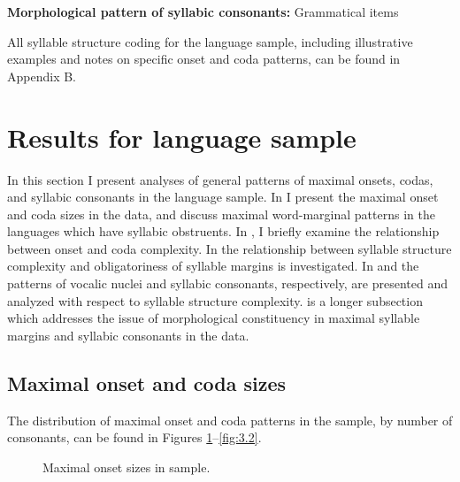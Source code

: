\textbf{Morphological pattern of syllabic consonants:} Grammatical items
\z

  All syllable structure coding for the language sample, including illustrative examples and notes on specific onset and coda patterns, can be found in Appendix B.

\section{Results for language sample}\label{sec:3.3}

  In this section I present analyses of general patterns of maximal onsets, codas, and syllabic consonants in the language sample. In  I present the maximal onset and coda sizes in the data, and discuss maximal word-marginal patterns in the languages which have syllabic obstruents. In , I briefly examine the relationship between onset and coda complexity. In  the relationship between syllable structure complexity and obligatoriness of syllable margins is investigated. In  and  the patterns of vocalic nuclei and syllabic consonants, respectively, are presented and analyzed with respect to syllable structure complexity.  is a longer subsection which addresses the issue of morphological constituency in maximal syllable margins and syllabic consonants in the data.

\subsection{Maximal onset and coda sizes}\label{sec:3.3.1}

  The distribution of maximal onset and coda patterns in the sample, by number of consonants, can be found in Figures \ref{fig:3.1}--\ref{fig:3.2}.

\begin{figure} 
\caption{\label{fig:3.1}Maximal onset sizes in sample.}
\end{figure}


